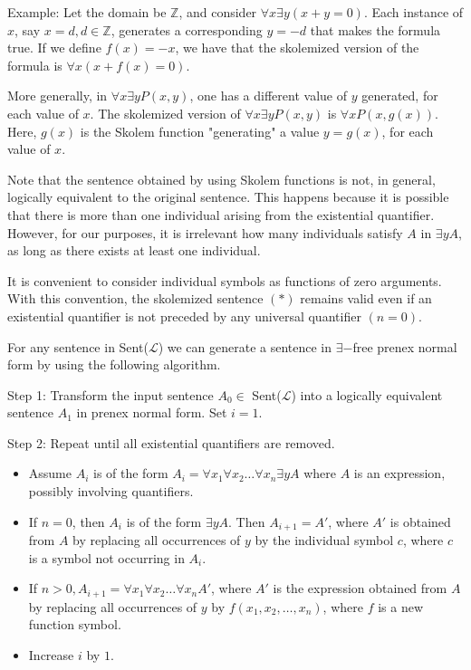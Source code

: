 \documentclass{article}
\begin{document}
Example: Let the domain be $\mathbb{Z}$, and consider $\forall x \exists y(x+y=0)$. Each instance of $x$, say $x = d, d \in \mathbb{Z}$, generates a corresponding $y = -d$ that makes the formula true. If we define $f(x) = -x$, we have that the skolemized version of the formula is $\forall x(x + f(x) = 0)$. 

More generally, in $\forall x \exists y P(x,y)$, one has a different value of $y$ generated, for each value of $x$. The skolemized version of $\forall x \exists y P(x,y)$ is $\forall x P(x,g(x))$. Here, $g(x)$ is the Skolem function "generating" a value $y = g(x)$, for each value of $x$.

Note that the sentence obtained by using Skolem functions is not, in general, logically equivalent to the original sentence. This happens because it is possible that there is more than one individual arising from the existential quantifier. However, for our purposes, it is irrelevant how many individuals satisfy $A$ in $\exists y A$, as long as there exists at least one individual.

It is convenient to consider individual symbols as functions of zero arguments. With this convention, the skolemized sentence $(*)$ remains valid even if an existential quantifier is not preceded by any universal quantifier $(n=0)$. 

For any sentence in Sent($\mathcal{L}$) we can generate a sentence in $\exists-$free prenex normal form by using the following algorithm.

Step 1: Transform the input sentence $A_0 \in $ Sent($\mathcal{L}$) into a logically equivalent sentence $A_1$ in prenex normal form. Set $i=1$. 

Step 2: Repeat until all existential quantifiers are removed.
\begin{itemize}
    \item Assume $A_i$ is of the form $A_i = \forall x_1 \forall x_2 \ldots \forall x_n \exists y A$ where $A$ is an expression, possibly involving quantifiers.
    \item If $n = 0$, then $A_i$ is of the form $\exists y A$. Then $A_{i+1} = A'$, where $A'$ is obtained from $A$ by replacing all occurrences of $y$ by the individual symbol $c$, where $c$ is a symbol not occurring in $A_i$. 
    \item If $n > 0, A_{i+1} = \forall x _1 \forall x_2 \ldots \forall x_n A'$, where $A'$ is the expression obtained from $A$ by replacing all occurrences of $y$ by $f(x_1, x_2, \ldots, x_n)$, where $f$ is a new function symbol.
    \item Increase $i$ by $1$.
\end{itemize}
\end{document}
